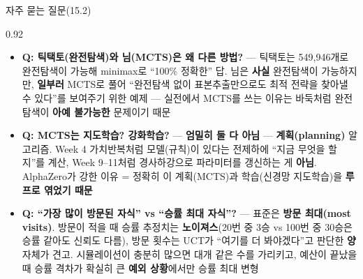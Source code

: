 \begin{frame}{자주 묻는 질문(15.2)}
\begin{center}\begin{varwidth}{0.92\textwidth}
  \small
  \begin{itemize}
    \item \textbf{Q: 틱택토(완전탐색)와 님(MCTS)은 왜 다른
      방법?} --- 틱택토는 549,946개로 완전탐색이 가능해
      minimax로 ``100\% 정확한'' 답. 님은 \textbf{사실}
      완전탐색이 가능하지만, \textbf{일부러} MCTS로 풀어
      ``완전탐색 없이 표본추출만으로도 최적 전략을 찾아낼 수
      있다''를 보여주기 위한 예제 --- 실전에서 MCTS를 쓰는
      이유는 바둑처럼 완전탐색이 \textbf{아예 불가능한}
      문제이기 때문
    \item \textbf{Q: MCTS는 지도학습? 강화학습?} --- \textbf{엄밀히
      둘 다 아님} --- \textbf{계획(planning)} 알고리즘.
      Week 4 가치반복처럼 모델(규칙)이 있다는 전제하에
      ``지금 무엇을 할지''를 계산, Week 9--11처럼 경사하강으로
      파라미터를 갱신하는 게 \textbf{아님}. AlphaZero가
      강한 이유 = 정확히 이 계획(MCTS)과 학습(신경망
      지도학습)을 \textbf{루프로 엮었기 때문}
    \item \textbf{Q: ``가장 많이 방문된 자식'' vs ``승률 최대
      자식''?} --- 표준은 \textbf{방문 최대(most visits)}.
      방문이 적을 때 승률 추정치는 \textbf{노이져스}(20번 중
      3승 vs 100번 중 30승은 승률 같아도 신뢰도 다름),
      방문 횟수는 UCT가 ``여기를 더 봐야겠다''고 판단한
      \textbf{양} 자체가 견고. 시뮬레이션이 충분히 많으면
      대개 같은 수를 가리키고, 예산이 끝났을 때 승률 격차가
      확실히 큰 \textbf{예외 상황}에서만 승률 최대 변형
  \end{itemize}
\end{varwidth}\end{center}
\end{frame}
